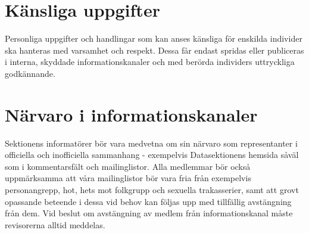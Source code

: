 \documentclass{dgovdoc}
\begin{document}
\section{Känsliga uppgifter}
Personliga uppgifter och handlingar som kan anses känsliga för enskilda individer ska hanteras med varsamhet och respekt. Dessa får endast spridas eller publiceras i interna, skyddade informationskanaler och med berörda individers uttryckliga godkännande. 

\section{Närvaro i informationskanaler}
Sektionens informatörer bör vara medvetna om sin närvaro som representanter i officiella och inofficiella sammanhang - exempelvis Datasektionens hemsida såväl som i kommentarsfält och mailinglistor. Alla medlemmar bör också uppmärksamma att våra mailinglistor bör vara fria från exempelvis personangrepp, hot, hets mot folkgrupp och sexuella trakasserier, samt att grovt opassande beteende i dessa vid behov kan följas upp med tillfällig avstängning från dem. Vid beslut om avstängning av medlem från informationskanal måste revisorerna alltid meddelas.
\end{document}
